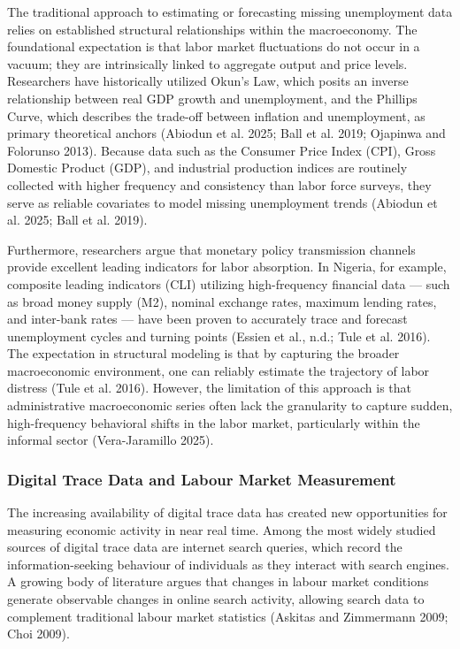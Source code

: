 \documentclass[
  letterpaper,
  DIV=11,
  numbers=noendperiod]{scrartcl}
\begin{document}
The traditional approach to estimating or forecasting missing
unemployment data relies on established structural relationships within
the macroeconomy. The foundational expectation is that labor market
fluctuations do not occur in a vacuum; they are intrinsically linked to
aggregate output and price levels. Researchers have historically
utilized Okun's Law, which posits an inverse relationship between real
GDP growth and unemployment, and the Phillips Curve, which describes the
trade-off between inflation and unemployment, as primary theoretical
anchors (Abiodun et al. 2025; Ball et al. 2019; Ojapinwa and Folorunso
2013). Because data such as the Consumer Price Index (CPI), Gross
Domestic Product (GDP), and industrial production indices are routinely
collected with higher frequency and consistency than labor force
surveys, they serve as reliable covariates to model missing unemployment
trends (Abiodun et al. 2025; Ball et al. 2019).

Furthermore, researchers argue that monetary policy transmission
channels provide excellent leading indicators for labor absorption. In
Nigeria, for example, composite leading indicators (CLI) utilizing
high-frequency financial data --- such as broad money supply (M2),
nominal exchange rates, maximum lending rates, and inter-bank rates ---
have been proven to accurately trace and forecast unemployment cycles
and turning points (Essien et al., n.d.; Tule et al. 2016). The
expectation in structural modeling is that by capturing the broader
macroeconomic environment, one can reliably estimate the trajectory of
labor distress (Tule et al. 2016). However, the limitation of this
approach is that administrative macroeconomic series often lack the
granularity to capture sudden, high-frequency behavioral shifts in the
labor market, particularly within the informal sector (Vera-Jaramillo
2025).

\subsubsection{Digital Trace Data and Labour Market
Measurement}\label{digital-trace-data-and-labour-market-measurement}

The increasing availability of digital trace data has created new
opportunities for measuring economic activity in near real time. Among
the most widely studied sources of digital trace data are internet
search queries, which record the information-seeking behaviour of
individuals as they interact with search engines. A growing body of
literature argues that changes in labour market conditions generate
observable changes in online search activity, allowing search data to
complement traditional labour market statistics (Askitas and Zimmermann
2009; Choi 2009).
\end{document}
